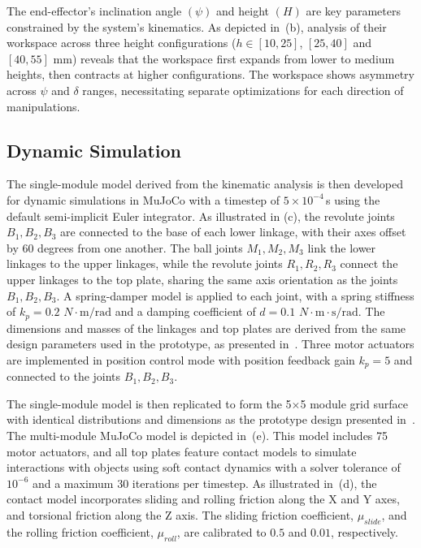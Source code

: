 The end-effector's inclination angle $(\psi)$ and height $(H)$ are key parameters constrained by the system's kinematics. As depicted in~(b), analysis of their workspace across three height configurations ($h\in[10, 25]$, $[25, 40]$ and $[40, 55]$ mm) reveals that the workspace first expands from lower to medium heights, then contracts at higher configurations. The workspace shows asymmetry across $\psi$ and $\delta$ ranges, necessitating separate optimizations for each direction of manipulations.


\subsection{Dynamic Simulation}
\label{sec:simulation}

The single-module model derived from the kinematic analysis is then developed for dynamic simulations in MuJoCo with a timestep of $5\times 10^{-4}$\,s using the default semi-implicit Euler integrator. As illustrated in (c), the revolute joints $B_1, B_2, B_3$ are connected to the base of each lower linkage, with their axes offset by $60$ degrees from one another. The ball joints $M_1, M_2, M_3$ link the lower linkages to the upper linkages, while the revolute joints $R_1, R_2, R_3$ connect the upper linkages to the top plate, sharing the same axis orientation as the joints $B_1, B_2, B_3$. A spring-damper model is applied to each joint, with a spring stiffness of $k_p = 0.2$ $N\cdot\text{m}/\text{rad}$ and a damping coefficient of $d = 0.1$ $N\cdot\text{m}\cdot\text{s}/\text{rad}$. The dimensions and masses of the linkages and top plates are derived from the same design parameters used in the prototype, as presented in~\cite{Oripixel}. Three motor actuators are implemented in position control mode with position feedback gain $k_p = 5$ and connected to the joints $B_1, B_2, B_3$. 

The single-module model is then replicated to form the 5$\times$5 module grid surface with identical distributions and dimensions as the prototype design presented in~\cite{Oripixel}. The multi-module MuJoCo model is depicted in~(e). 
This model includes 75 motor actuators, and all top plates feature contact models to simulate interactions with objects using soft contact dynamics with a solver tolerance of $10^{-6}$ and a maximum 30 iterations per timestep. As illustrated in~(d), the contact model incorporates sliding and rolling friction along the X and Y axes, and torsional friction along the Z axis. The sliding friction coefficient, $\mu_{slide}$, and the rolling friction coefficient, $\mu_{roll}$, are calibrated to $0.5$ and $0.01$, respectively. 
